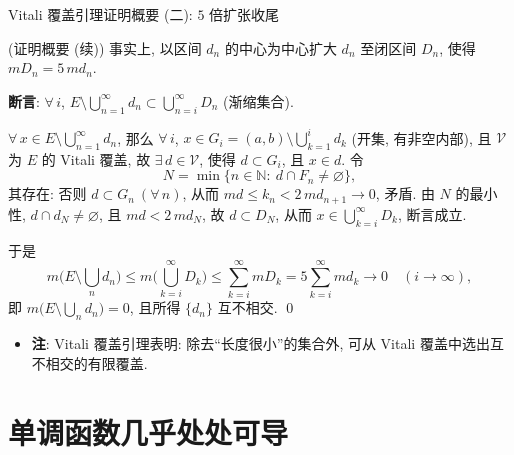 \begin{frame}{Vitali 覆盖引理证明概要 (二): $5$ 倍扩张收尾}

\startproof[bg=yellow, fg=red](证明概要 (续))
事实上, 以区间 $d_n$ 的中心为中心扩大 $d_n$ 至闭区间 $D_n$,
使得 $m D_n = 5\, m d_n$.

\textbf{断言}: $\forall\, i$, $E \setminus \bigcup_{n=1}^{\infty} d_n
\subset \bigcup_{n=i}^{\infty} D_n$ (渐缩集合).

$\forall\, x \in E \setminus \bigcup_{n=1}^{\infty} d_n$, 那么 $\forall\, i$,
$x \in G_i = (a, b) \setminus \bigcup_{k=1}^{i} d_k$ (开集, 有非空内部), 且
$\mathscr{V}$ 为 $E$ 的 Vitali 覆盖, 故 $\exists\, d \in \mathscr{V}$, 使得
$d \subset G_i$, 且 $x \in d$. 令
\[
N = \min \big\{ n \in \mathbb{N}:\ d \cap F_n \neq \varnothing \big\} ,
\]
其存在: 否则 $d \subset G_n\ (\forall\, n)$, 从而
$m d \leqslant k_n < 2\, m d_{n+1} \to 0$, 矛盾. 由 $N$ 的最小性, $d \cap d_N \neq \varnothing$,
且 $m d < 2\, m d_N$, 故 $d \subset D_N$, 从而
$x \in \bigcup_{k=i}^{\infty} D_k$, 断言成立.

\pause

于是
\[
m \Big( E \setminus \bigcup_n d_n \Big)
\leqslant m \Big( \bigcup_{k=i}^{\infty} D_k \Big)
\leqslant \sum_{k=i}^{\infty} m D_k
= 5 \sum_{k=i}^{\infty} m d_k
\longrightarrow 0 \quad (i \to \infty) ,
\]
即 $m \big( E \setminus \bigcup_n d_n \big) = 0$, 且所得 $\{ d_n \}$ 互不相交.
\qed

\pause

\begin{itemize}
\item \textbf{注}: Vitali 覆盖引理表明: 除去``长度很小''的集合外,
  可从 Vitali 覆盖中选出\alert{互不相交}的有限覆盖.
\end{itemize}

\end{frame}


\section[勒贝格定理]{单调函数几乎处处可导}



